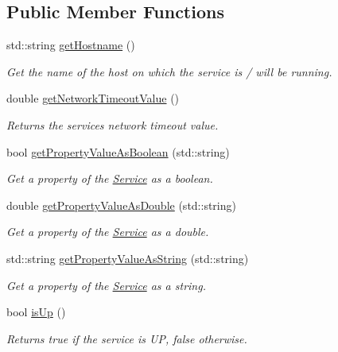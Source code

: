 \subsection*{Public Member Functions}
\begin{DoxyCompactItemize}
\item 
std\+::string \hyperlink{classwrench_1_1_service_a0b129fca804f421faba9445832a9cb48}{get\+Hostname} ()
\begin{DoxyCompactList}\small\item\em Get the name of the host on which the service is / will be running. \end{DoxyCompactList}\item 
double \hyperlink{classwrench_1_1_service_a113a90bcf686c79df677bb6dab61fc4e}{get\+Network\+Timeout\+Value} ()
\begin{DoxyCompactList}\small\item\em Returns the service\textquotesingle{}s network timeout value. \end{DoxyCompactList}\item 
bool \hyperlink{classwrench_1_1_service_aaacc5398b7fa16262348446006dba884}{get\+Property\+Value\+As\+Boolean} (std\+::string)
\begin{DoxyCompactList}\small\item\em Get a property of the \hyperlink{classwrench_1_1_service}{Service} as a boolean. \end{DoxyCompactList}\item 
double \hyperlink{classwrench_1_1_service_af7d4b5085ba46d9cead58f2d253e8339}{get\+Property\+Value\+As\+Double} (std\+::string)
\begin{DoxyCompactList}\small\item\em Get a property of the \hyperlink{classwrench_1_1_service}{Service} as a double. \end{DoxyCompactList}\item 
std\+::string \hyperlink{classwrench_1_1_service_af7da6bc9cb5d322bfdc6467941f2372f}{get\+Property\+Value\+As\+String} (std\+::string)
\begin{DoxyCompactList}\small\item\em Get a property of the \hyperlink{classwrench_1_1_service}{Service} as a string. \end{DoxyCompactList}\item 
bool \hyperlink{classwrench_1_1_service_a2549b97c1454e075ebadbb38563763e0}{is\+Up} ()
\begin{DoxyCompactList}\small\item\em Returns true if the service is UP, false otherwise. \end{DoxyCompactList}\item 

\end{DoxyCompactItemize}
